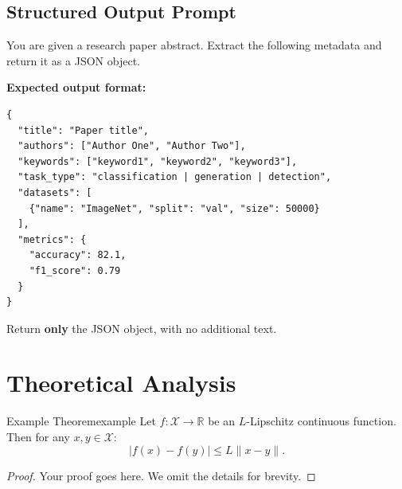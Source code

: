 \subsection{Structured Output Prompt}

\begin{promptbox}
\noindent You are given a research paper abstract. Extract the following metadata and return it as a JSON object.

\vspace{0.5em}
\noindent\textbf{Expected output format:}
\begin{lstlisting}[style=json]
{
  "title": "Paper title",
  "authors": ["Author One", "Author Two"],
  "keywords": ["keyword1", "keyword2", "keyword3"],
  "task_type": "classification | generation | detection",
  "datasets": [
    {"name": "ImageNet", "split": "val", "size": 50000}
  ],
  "metrics": {
    "accuracy": 82.1,
    "f1_score": 0.79
  }
}
\end{lstlisting}

\noindent Return \textbf{only} the JSON object, with no additional text.
\end{promptbox}

\section{Theoretical Analysis}
\label{sec:theoretical_analysis}

%

\begin{theorem}{Example Theorem}{example}
Let $f: \mathcal{X} \rightarrow \mathbb{R}$ be an $L$-Lipschitz continuous function. Then for any $x, y \in \mathcal{X}$:
\begin{equation}
  |f(x) - f(y)| \leq L \|x - y\|.
\end{equation}
\end{theorem}

\begin{proof}
Your proof goes here. We omit the details for brevity.
\end{proof}
